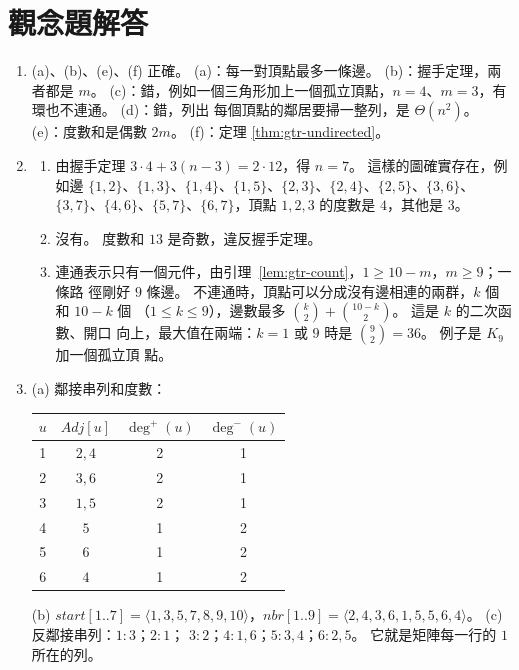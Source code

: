 \section*{觀念題解答}

\begin{enumerate}
\item (a)、(b)、(e)、(f) 正確。 (a)：每一對頂點最多一條邊。 (b)：握手定理，兩者都是 $m$。
(c)：錯，例如一個三角形加上一個孤立頂點，$n = 4$、$m = 3$，有環也不連通。 (d)：錯，列出
每個頂點的鄰居要掃一整列，是 $\Theta(n^2)$。 (e)：度數和是偶數 $2m$。 (f)：定理
\ref{thm:gtr-undirected}。

\item
\begin{enumerate}
\item 由握手定理 $3 \cdot 4 + 3(n - 3) = 2 \cdot 12$，得 $n = 7$。 這樣的圖確實存在，例如邊
$\{1,2\}$、$\{1,3\}$、$\{1,4\}$、$\{1,5\}$、$\{2,3\}$、$\{2,4\}$、$\{2,5\}$、$\{3,6\}$、
$\{3,7\}$、$\{4,6\}$、$\{5,7\}$、$\{6,7\}$，頂點 $1, 2, 3$ 的度數是 $4$，其他是 $3$。
\item 沒有。 度數和 $13$ 是奇數，違反握手定理。
\item 連通表示只有一個元件，由引理~\ref{lem:gtr-count}，$1 \ge 10 - m$，$m \ge 9$；一條路
徑剛好 $9$ 條邊。 不連通時，頂點可以分成沒有邊相連的兩群，$k$ 個和 $10 - k$ 個
（$1 \le k \le 9$），邊數最多 $\binom{k}{2} + \binom{10-k}{2}$。 這是 $k$ 的二次函數、開口
向上，最大值在兩端：$k = 1$ 或 $9$ 時是 $\binom{9}{2} = 36$。 例子是 $K_9$ 加一個孤立頂
點。
\end{enumerate}

\item (a) 鄰接串列和度數：

\begin{center}
\begin{tabular}{cccc}
\toprule
$u$ & $\mathit{Adj}[u]$ & $\deg^{+}(u)$ & $\deg^{-}(u)$ \\
\midrule
1 & $2, 4$ & 2 & 1 \\
2 & $3, 6$ & 2 & 1 \\
3 & $1, 5$ & 2 & 1 \\
4 & $5$ & 1 & 2 \\
5 & $6$ & 1 & 2 \\
6 & $4$ & 1 & 2 \\
\bottomrule
\end{tabular}
\end{center}

(b) $\mathit{start}[1..7] = \langle 1, 3, 5, 7, 8, 9, 10 \rangle$，$\mathit{nbr}[1..9] =
\langle 2, 4, 3, 6, 1, 5, 5, 6, 4 \rangle$。 (c) 反鄰接串列：$1\colon 3$；$2\colon 1$；
$3\colon 2$；$4\colon 1, 6$；$5\colon 3, 4$；$6\colon 2, 5$。 它就是矩陣每一行的 $1$ 所在的列。


\end{enumerate}
